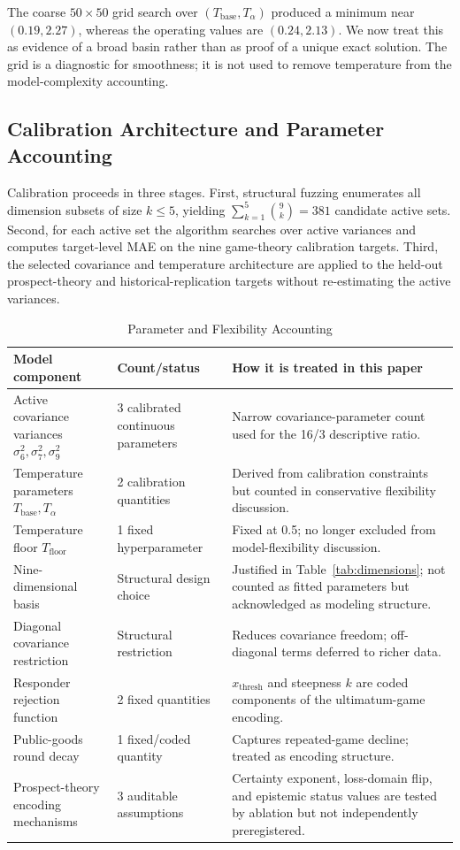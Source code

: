 \documentclass[journal]{IEEEtran}
\begin{document}
The coarse $50\times50$ grid search over $(T_{\text{base}},T_\alpha)$ produced a minimum near $(0.19,2.27)$, whereas the operating values are $(0.24,2.13)$.
We now treat this as evidence of a broad basin rather than as proof of a unique exact solution.
The grid is a diagnostic for smoothness; it is not used to remove temperature from the model-complexity accounting.

\subsection{Calibration Architecture and Parameter Accounting}

Calibration proceeds in three stages.
First, structural fuzzing enumerates all dimension subsets of size $k\leq5$, yielding $\sum_{k=1}^5 \binom{9}{k}=381$ candidate active sets.
Second, for each active set the algorithm searches over active variances and computes target-level MAE on the nine game-theory calibration targets.
Third, the selected covariance and temperature architecture are applied to the held-out prospect-theory and historical-replication targets without re-estimating the active variances.

\begin{table}[!t]
\renewcommand{\arraystretch}{1.15}
\caption{Parameter and Flexibility Accounting}
\label{tab:param_accounting}
\centering
\begin{tabular}{p{} p{} p{}}
\toprule
\textbf{Model component} & \textbf{Count/status} & \textbf{How it is treated in this paper} \\
\midrule
Active covariance variances $\sigma_6^2,\sigma_7^2,\sigma_9^2$ & 3 calibrated continuous parameters & Narrow covariance-parameter count used for the 16/3 descriptive ratio. \\
Temperature parameters $T_{\text{base}},T_\alpha$ & 2 calibration quantities & Derived from calibration constraints but counted in conservative flexibility discussion. \\
Temperature floor $T_{\text{floor}}$ & 1 fixed hyperparameter & Fixed at 0.5; no longer excluded from model-flexibility discussion. \\
Nine-dimensional basis & Structural design choice & Justified in Table~\ref{tab:dimensions}; not counted as fitted parameters but acknowledged as modeling structure. \\
Diagonal covariance restriction & Structural restriction & Reduces covariance freedom; off-diagonal terms deferred to richer data. \\
Responder rejection function & 2 fixed quantities & $x_{\text{thresh}}$ and steepness $k$ are coded components of the ultimatum-game encoding. \\
Public-goods round decay & 1 fixed/coded quantity & Captures repeated-game decline; treated as encoding structure. \\
Prospect-theory encoding mechanisms & 3 auditable assumptions & Certainty exponent, loss-domain flip, and epistemic status values are tested by ablation but not independently preregistered. \\
\bottomrule
\end{tabular}
\end{table}
\end{document}
